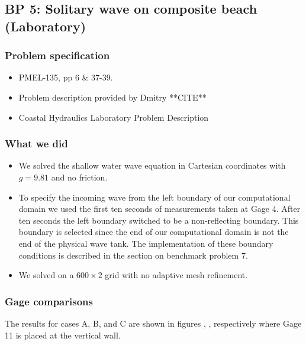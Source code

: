 \newsection

\subsection{BP 5:
 Solitary wave on composite beach (Laboratory) }


\subsubsection{Problem specification}

\begin{itemize}
\item PMEL-135, pp 6 \& 37-39.
\item Problem description provided by Dmitry **CITE**
\item Coastal Hydraulics Laboratory Problem Description\cite{CHLBP2}
\end{itemize}

\subsubsection{What we did}
\begin{itemize}
\item We solved the shallow water wave equation in Cartesian coordinates with $g = 9.81$ and no friction.
\item To specify the incoming wave from the left boundary of our computational domain we used the first ten seconds of  measurements taken at Gage 4.  After ten seconds the left boundary switched to be a non-reflecting boundary.  This boundary is selected since the end of our computational domain is not the end of the physical wave tank.  The implementation of these boundary conditions is described in the section on benchmark problem 7. 
\item We solved on a $600 \times 2$ grid with no adaptive mesh refinement. 
\end{itemize}

\subsubsection{Gage comparisons}
The results for cases A, B, and C are shown in figures , ,  respectively where Gage 11 is placed at the vertical wall.

